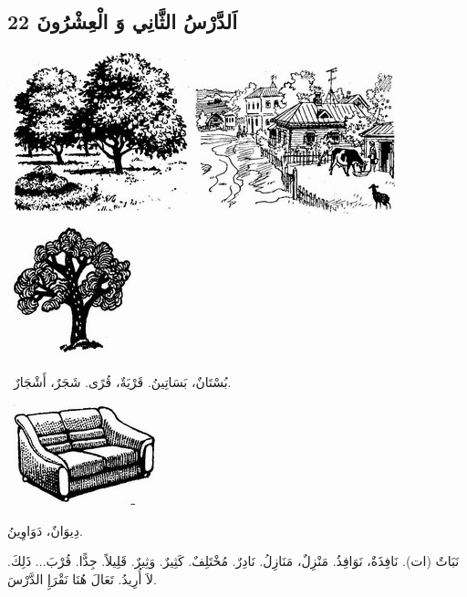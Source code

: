 \documentclass[a5paper]{article}
\begin{document}
\subsection{22 اَلدَّرْسُ الثَّانِي وَ الْعِشْرُونَ}
 \includegraphics[width=2.0835in,height=1.8752in]{images/MuhammadBagauddinprettified-img036.jpg}   \includegraphics[width=2.2917in,height=1.7291in]{images/MuhammadBagauddinprettified-img037.jpg}   \includegraphics[width=1.448in,height=1.5626in]{images/MuhammadBagauddinprettified-img038.jpg} 

\ بُسْتَانٌ، بَسَاتِينُ. قَرْيَةٌ، قُرًى. شَجَرٌ، أَشْجَارٌ. 

 \includegraphics[width=1.75in,height=1.1457in]{images/MuhammadBagauddinprettified-img039.jpg}  

دِيوَانٌ، دَوَاوِينُ. 

نَبَاتٌ (ات). نَافِذَةٌ، نَوَافِذُ. مَنْزِلٌ، مَنَازِلُ. نَادِرٌ. مُخْتَلِفٌ. كَثِيرٌ. وَثِيرٌ. قَلِيلاً. جِدًّا. قُرْبَ... ذَلِكَ. لاَ أُرِيدُ. تَعَالَ هُنَا نَقْرَإِ الدَّرْسَ.
\end{document}
